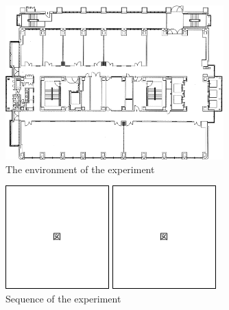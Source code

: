   \begin{figure}[h]
    \centering
    \includegraphics[keepaspectratio, scale=0.70] {images/RobotGuidance_cit3f.png}
    \captionsetup{justification=raggedright} %
    \caption{The environment of the experiment}
    \label{Fig:RobotGuidance_cit3f}
  \end{figure}

  \begin{figure}[h]
    \centering
    \begin{minipage}[c]{65mm} 
        \centering
        \includegraphics[height=40mm]{images/figure.png}
    \end{minipage}
    \begin{minipage}[c]{65mm} 
        \centering
        \includegraphics[height=40mm]{images/figure.png}
    \end{minipage}
    \caption{Sequence of the experiment}
    \label{Fig:Sequence of the experiment}
  \end{figure}

\newpage
